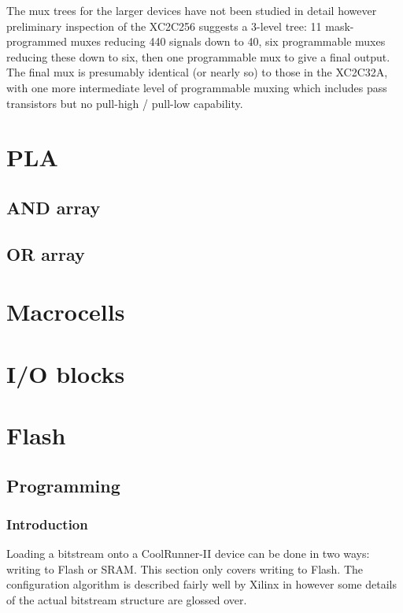 \documentclass[pdftex,letterpaper]{article}
\begin{document}
The mux trees for the larger devices have not been studied in detail however preliminary inspection of the XC2C256 
suggests a 3-level tree: 11 mask-programmed muxes reducing 440 signals down to 40, six programmable muxes reducing 
these down to six, then one programmable mux to give a final output. The final mux is presumably identical (or 
nearly so) to those in the XC2C32A, with one more intermediate level of programmable muxing which includes pass 
transistors but no pull-high / pull-low capability.

\FloatBarrier
\section{PLA}

\subsection{AND array}

\subsection{OR array}

\section{Macrocells}

\section{I/O blocks}

\section{Flash}

\subsection{Programming}

\subsubsection{Introduction}

Loading a bitstream onto a CoolRunner-II device can be done in two ways: writing to Flash or SRAM. This section 
only covers writing to Flash. The configuration algorithm is described fairly well by Xilinx in \cite{progspec} 
however some details of the actual bitstream structure are glossed over.
\end{document}
